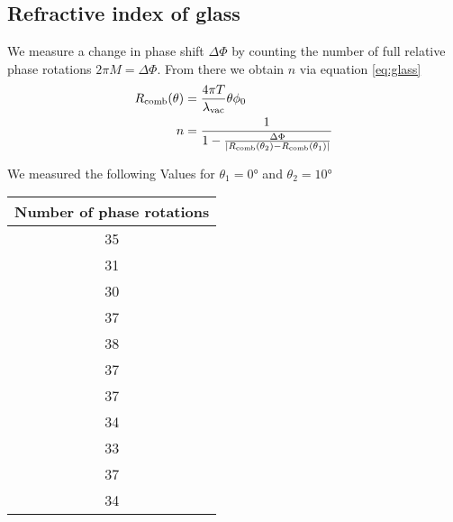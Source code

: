 \subsection{Refractive index of glass}
We measure a change in phase shift $\Delta \Phi$ by counting the number of full
relative phase rotations $2 \pi M = \Delta \Phi$. From there we obtain $n$ via
equation \eqref{eq:glass}
\begin{align}
	R_\text{comb}(\theta) &= \frac{4\pi T}{\lambda_\text{vac}}\theta\phi_0\\
	n & = \frac{1}{1-\frac{\Delta \Phi}{\left|R_\text{comb}(\theta_{2})-R_\text{comb}(\theta_{1})\right|} } \label{eq:nAtmos}
\end{align}

We measured the following Values for $\theta_1 = 0°$ and $\theta_2 = 10°$
\begin{table}[H]
	\centering
	\begin{tabular}{c}
		\toprule
		Number of phase rotations \\
		\midrule
		35                        \\
		31                        \\
		30                        \\
		37                        \\
		38                        \\
		37                        \\
		37                        \\
		34                        \\
		33                        \\
		37                        \\
		34                        \\
		\bottomrule
	\end{tabular}
\end{table}

